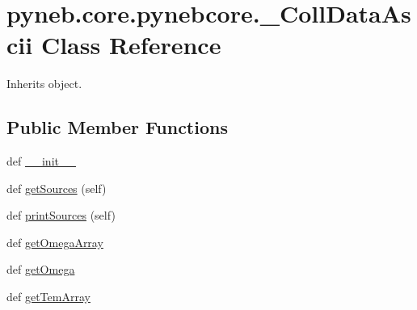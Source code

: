 \hypertarget{classpyneb_1_1core_1_1pynebcore_1_1___coll_data_ascii}{}\section{pyneb.\+core.\+pynebcore.\+\_\+\+Coll\+Data\+Ascii Class Reference}
\label{classpyneb_1_1core_1_1pynebcore_1_1___coll_data_ascii}


Inherits object.

\subsection*{Public Member Functions}
\begin{DoxyCompactItemize}
\item 
def \hyperlink{classpyneb_1_1core_1_1pynebcore_1_1___coll_data_ascii_ad4514c646ad1e65d9d5e10c80d215041}{\+\_\+\+\_\+init\+\_\+\+\_\+}
\item 
def \hyperlink{classpyneb_1_1core_1_1pynebcore_1_1___coll_data_ascii_a35b3c891312962903e5ee00cf992db48}{get\+Sources} (self)
\item 
def \hyperlink{classpyneb_1_1core_1_1pynebcore_1_1___coll_data_ascii_a05df67dc5de0c75eb3a7055af7044c31}{print\+Sources} (self)
\item 
def \hyperlink{classpyneb_1_1core_1_1pynebcore_1_1___coll_data_ascii_ac78bf2ddca80543884f09c2924308351}{get\+Omega\+Array}
\item 
def \hyperlink{classpyneb_1_1core_1_1pynebcore_1_1___coll_data_ascii_a2f99c08a0f6a46d88b6e09b0a36495c2}{get\+Omega}
\item 
def \hyperlink{classpyneb_1_1core_1_1pynebcore_1_1___coll_data_ascii_aaf234dd4932c7f789eb8eaaf6a16cfc9}{get\+Tem\+Array}
\end{DoxyCompactItemize}
